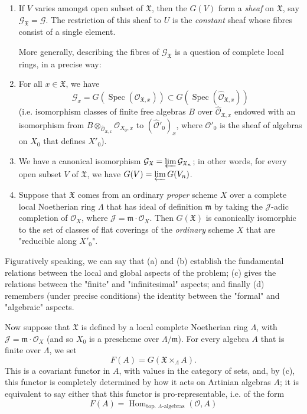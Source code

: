 \begin{enumerate}[]
    \item If $V$ varies amongst open subset of $\mathfrak{X}$, then the $G(V)$ form a \emph{sheaf} on $\mathfrak{X}$, say $\mathcal{G}_\mathfrak{X}=\mathcal{G}$.
          The restriction of this sheaf to $U$ is the \emph{constant} sheaf whose fibres consist of a single element.

          More generally, describing the fibres of $\mathcal{G}_\mathfrak{X}$ is a question of complete local rings, in a precise way:
    \item For all $x\in\mathfrak{X}$, we have
          \[
              \mathcal{G}_x = G(\operatorname{Spec}(\mathcal{O}_{\mathfrak{X},x})) \subset G(\operatorname{Spec}(\widehat{\mathcal{O}}_{\mathfrak{X},x}))
          \]
          (i.e. isomorphism classes of finite free algebras $B$ over $\widehat{\mathcal{O}}_{\mathfrak{X},x}$ endowed with an isomorphism from $B\otimes_{\widehat{\mathcal{O}}_{\mathfrak{X},x}}\mathcal{O}_{X_0,x}$ to $(\widehat{\mathcal{O}}'_0)_x$, where $\mathcal{O}'_0$ is the sheaf of algebras on $X_0$ that defines $X'_0$).
    \item We have a canonical isomorphism $\mathcal{G}_\mathfrak{X}=\varprojlim\mathcal{G}_{\mathfrak{X}_n}$; in other words, for every open subset $V$ of $\mathfrak{X}$, we have $G(V)=\varprojlim G(V_n)$.
    \item Suppose that $\mathfrak{X}$ comes from an ordinary \emph{proper} scheme $X$ over a complete local Noetherian ring $\Lambda$ that has ideal of definition $\mathfrak{m}$ by taking the $\mathcal{J}$-adic completion of $\mathcal{O}_X$, where $\mathcal{J}=\mathfrak{m}\cdot\mathcal{O}_X$.
          Then $G(\mathfrak{X})$ is canonically isomorphic to the set of classes of flat coverings of the \emph{ordinary} scheme $X$ that are "reducible along $X'_0$".
\end{enumerate}

Figuratively speaking, we can say that (a) and (b) establish the fundamental relations between the local and global aspects of the problem; (c) gives the relations between the "finite" and "infinitesimal" aspects; and finally (d) remembers (under precise conditions) the identity between the "formal" and "algebraic" aspects.

Now suppose that $\mathfrak{X}$ is defined by a local complete Noetherian ring $\Lambda$, with $\mathcal{J}=\mathfrak{m}\cdot\mathcal{O}_X$ (and so $X_0$ is a prescheme over ${\Lambda}/\mathfrak{m}$).
For every algebra $A$ that is finite over $\Lambda$, we set
\[
    F(A)
    = G(\mathfrak{X}\times_\Lambda A).
\]
This is a covariant functor in $A$, with values in the category of sets, and, by (c), this functor is completely determined by how it acts on Artinian algebras $A$;
it is equivalent to say either that this functor is pro-representable, i.e. of the form
\[
    F(A)
    = \operatorname{Hom}_{\text{top. }\Lambda\text{-algebras}}(\mathcal{O},A)
\]

